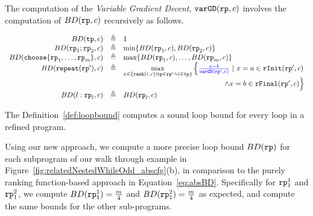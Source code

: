 The computation of the \emph{Variable Gradient Decent}, 
$\mathtt{varGD}(\mathtt{rp}, c)$ involves the computation of $BD(\mathtt{rp}, c)$ recursively as follows.
\begin{defn}
\label{def:loopbound}
  \[
    \begin{array}{rcl}
      BD(\tpath, c) & \triangleq & 1 \\
      BD(\rprog_1;\rprog_2, c) & \triangleq & \min \left\{BD(\rprog_1, c), BD(\rprog_2, c) \right\} \\
      BD(\rpchoose{\rprog_1, \ldots, \rprog_m }, c) & \triangleq 
      & \max\left\{ BD(\rprog_1, c), \ldots, BD(\rprog_m, c) \right\} \\
      BD(\rprepeat(\rprog'), c) & \triangleq 
      &
      \max\limits_{x \in \left\{ \locbound(\absevent, c) | \tpath \in \rprog' \land \absevent \in \tpath \right\}}
      \Big\{ \highlight{\frac{a - b}{\varGD(\rprog', c)}} ~\vert~
      x = a \in \rfinit(\rprog', c)
      \\ & & \qquad \qquad \qquad \qquad \qquad \qquad \qquad 
      \land x = b \in \rffinal(\rprog', c)
      \Big\} 
      \\
      BD(l: \rprog_l, c) & \triangleq & BD(\rprog_l, c)
    \end{array}
  \]
\end{defn}
The Definition~\ref{def:loopbound} computes a sound loop bound for every loop in a refined program.

Using our new approach, we compute a more precise loop bound $BD(\mathtt{rp})$ for each subprogram of our walk through example in Figure~\ref{fig:relatedNestedWhileOdd_abscfg}(b), in comparison to the purely ranking function-based approach in Equation~\ref{eq:absBD}.
Specifically for $\mathtt{rp}_1^1$ and $\mathtt{rp}_1^2$, we compute $BD(\mathtt{rp}_1^1) = \frac{m}{4}$ and $BD(\mathtt{rp}_1^2) = \frac{m}{4}$ as expected,
and compute the same bounds for the other sub-programs.

